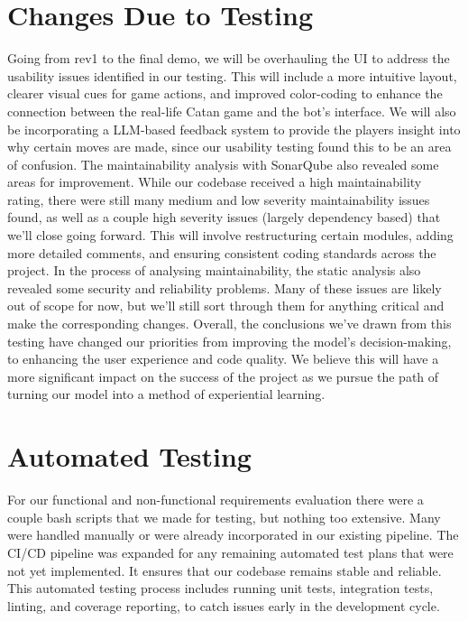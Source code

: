 \documentclass[12pt, titlepage]{article}
\begin{document}
\section{Changes Due to Testing}
Going from rev1 to the final demo, we will be
overhauling the UI to address the usability issues identified in our testing. This will include a more intuitive layout,
clearer visual cues for game actions, and improved color-coding to enhance the connection between the real-life Catan game and the bot's interface.
We will also be incorporating a LLM-based feedback system to provide the players insight into why certain moves are made, since our usability testing found this to be an area of confusion.
The maintainability analysis with SonarQube also revealed some areas for improvement.
While our codebase received a high maintainability rating, there were still many medium and low severity maintainability issues found, as well as a couple high severity issues (largely dependency based) that we'll close going forward.
This will involve restructuring certain modules, adding more detailed comments, and ensuring consistent coding standards across the project.
In the process of analysing maintainability, the static analysis also revealed some security and reliability problems.
Many of these issues are likely out of scope for now, but we'll still sort through them for anything critical and make the corresponding changes.
Overall, the conclusions we've drawn from this testing have changed our priorities from improving the model's decision-making, to enhancing the user experience and code quality.
We believe this will have a more significant impact on the success of the project as we pursue the path of turning our model into a method of experiential learning.

\section{Automated Testing}

For our functional and non-functional requirements evaluation there were a couple bash scripts that we made for testing,
but nothing too extensive.
Many were handled manually or were already incorporated in our existing pipeline.
The CI/CD pipeline was expanded for any remaining automated test plans that were not yet implemented.
It ensures that our codebase remains stable and reliable.
This automated testing process includes running unit tests, integration tests, linting, and coverage reporting, to catch issues early in the development cycle.
\end{document}
